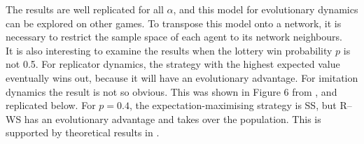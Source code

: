 \FloatBarrier
The results are well replicated for all $\alpha$, and this model for evolutionary dynamics can be explored on other games. To transpose this model onto a network, it is necessary to restrict the sample space of each agent to its network neighbours. \\

 It is also interesting to examine the results when the lottery win probability $p$ is not 0.5. For replicator dynamics, the strategy with the highest expected value eventually wins out, because it will have an evolutionary advantage. For imitation dynamics the result is not so obvious. This was shown in Figure 6 from \cite{RN30}, and replicated below. For $p=0.4$, the expectation-maximising strategy is SS, but R--WS has an evolutionary advantage and takes over the population. This is supported by theoretical results in \cite{RN30}.  \\
 
